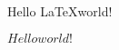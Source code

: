 \documentclass[12pt]{article}
\begin{document}
Hello \LaTeX world!

$Hello world!$ %
\end{document}
